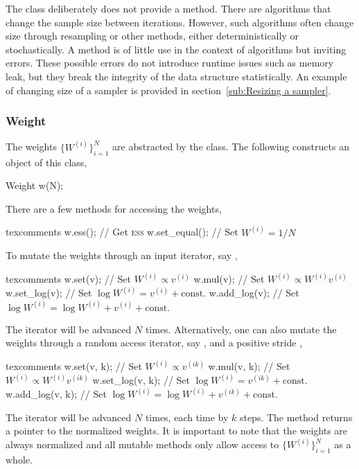 The  class deliberately does not provide a
 method. There are algorithms that change the sample size
between iterations. However, such algorithms often change size through
resampling or other methods, either deterministically or stochastically. A
 method is of little use in the context of \smc algorithms
but inviting errors. These possible errors do not introduce runtime issues such
as memory leak, but they break the integrity of the data structure
statistically. An example of changing size of a sampler is provided in
section~\ref{sub:Resizing a sampler}.

\subsubsection{Weight}
\label{ssub:Weight}

The weights $\{W^{(i)}\}_{i=1}^N$ are abstracted by the 
class. The following constructs an object of this class,
\begin{cppcode}
  Weight w(N);
\end{cppcode}
There are a few methods for accessing the weights,
\begin{cppcode*}{texcomments}
  w.ess();          // Get {\normalfont\textsc{ess}}
  w.set_equal();    // Set $W^{(i)} = 1/N$
\end{cppcode*}
To mutate the weights through an input iterator, say ,
\begin{cppcode*}{texcomments}
  w.set(v);         // Set $W^{(i)} \propto v^{(i)}$
  w.mul(v);         // Set $W^{(i)} \propto W^{(i)} v^{(i)}$
  w.set_log(v);     // Set $\log W^{(i)} = v^{(i)} + \text{const.}$
  w.add_log(v);     // Set $\log W^{(i)} = \log W^{(i)} + v^{(i)} + \text{const.}$
\end{cppcode*}
The iterator will be advanced $N$ times. Alternatively, one can also mutate the
weights through a random access iterator, say , and a positive
stride ,
\begin{cppcode*}{texcomments}
  w.set(v, k);      // Set $W^{(i)} \propto v^{(ik)}$
  w.mul(v, k);      // Set $W^{(i)} \propto W^{(i)} v^{(ik)}$
  w.set_log(v, k);  // Set $\log W^{(i)} = v^{(ik)} + \text{const.}$
  w.add_log(v, k);  // Set $\log W^{(i)} = \log W^{(i)} + v^{(ik)} + \text{const.}$
\end{cppcode*}
The iterator will be advanced $N$ times, each time by $k$ steps. The method
 returns a pointer to the normalized weights. It is
important to note that the weights are always normalized and all mutable
methods only allow access to $\{W^{(i)}\}_{i=1}^N$ as a whole.

